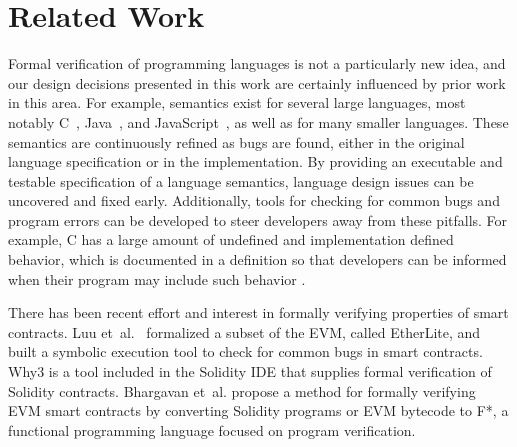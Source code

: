 \section{Related Work}
Formal verification of programming languages is not a particularly new idea,
and our design decisions presented in this work are certainly influenced by
prior work in this area. For example, \K{} semantics exist for several large languages, most notably
C~\cite{ellison-2012-thesis}, Java~\cite{bogdanas-rosu-2015-popl}, and
JavaScript~\cite{park-stefanescu-rosu-2015-pldi}, as well as for many smaller languages. These semantics are
continuously refined as bugs are found, either in the original language
specification or in the \K{} implementation. By providing an executable and
testable specification of a language semantics, language design issues can be
uncovered and fixed early. Additionally, tools for checking for common bugs and
program errors can be developed to steer developers away from these pitfalls.
For example, C has a large amount of undefined and implementation defined
behavior, which is documented in a \K{} definition so that developers can be
informed when their program may include such behavior
\cite{guth-hathhorn-saxena-rosu-2016-cav}.

There has been recent effort and interest in formally verifying properties of
smart contracts. Luu et~al.~\cite{luumaking} formalized a subset of the EVM,
called EtherLite, and built a symbolic execution tool to check for common bugs
in smart contracts. Why3 is a tool included in the Solidity IDE that supplies
formal verification of Solidity contracts. Bhargavan et~al.\cite{evmf*} propose a method for formally
verifying EVM smart contracts by converting Solidity programs or EVM bytecode to
F*, a functional programming language focused on program verification.

